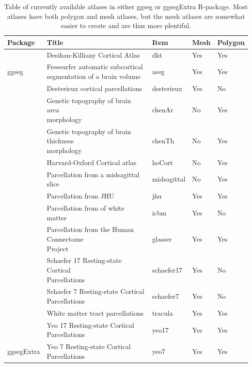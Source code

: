 \documentclass[fleqn,10pt]{wlpeerj} %
\begin{document}
\begin{table}[t]

\caption{\label{tab:atlasTab}Table of currently available atlases in either ggseg or ggsegExtra R-package. Most atlases have both polygon and mesh atlases, but the mesh atlases are somewhat easier to create and are thus more plentiful.}
\centering
\begin{tabular}{lllll}
\toprule
Package & Title & Item & Mesh & Polygon\\
\midrule
 & Desikan-Killiany Cortical Atlas & dkt & Yes & Yes\\
\cmidrule{2-5}
\multirow{-2}{*}{\raggedright\arraybackslash ggseg} & \makecell[l]{Freesurfer automatic subcortical\\segmentation of a brain volume} & aseg & Yes & Yes\\
\cmidrule{1-5}
 & Desterieux cortical parcellations & desterieux & Yes & No\\
\cmidrule{2-5}
 & \makecell[l]{Genetic topography of brain area\\morphology} & chenAr & No & Yes\\
\cmidrule{2-5}
 & \makecell[l]{Genetic topography of brain thickness\\morphology} & chenTh & No & Yes\\
\cmidrule{2-5}
 & Harvard-Oxford Cortical atlas & hoCort & No & Yes\\
\cmidrule{2-5}
 & Parcellation from a midsagittal slice & midsagittal & No & Yes\\
\cmidrule{2-5}
 & Parcellation from JHU & jhu & Yes & Yes\\
\cmidrule{2-5}
 & Parcellation from of white matter & icbm & Yes & No\\
\cmidrule{2-5}
 & \makecell[l]{Parcellation from the Human Connectome\\Project} & glasser & Yes & Yes\\
\cmidrule{2-5}
 & \makecell[l]{Schaefer 17 Resting-state Cortical\\Parcellations} & schaefer17 & Yes & No\\
\cmidrule{2-5}
 & \makecell[l]{Schaefer 7 Resting-state Cortical\\Parcellations} & schaefer7 & Yes & No\\
\cmidrule{2-5}
 & White matter tract parcellations & tracula & Yes & Yes\\
\cmidrule{2-5}
 & \makecell[l]{Yeo 17 Resting-state Cortical\\Parcellations} & yeo17 & Yes & Yes\\
\cmidrule{2-5}
\multirow{-13}{*}{\raggedright\arraybackslash ggsegExtra} & \makecell[l]{Yeo 7 Resting-state Cortical\\Parcellations} & yeo7 & Yes & Yes\\
\bottomrule
\end{tabular}
\end{table}
\end{document}
